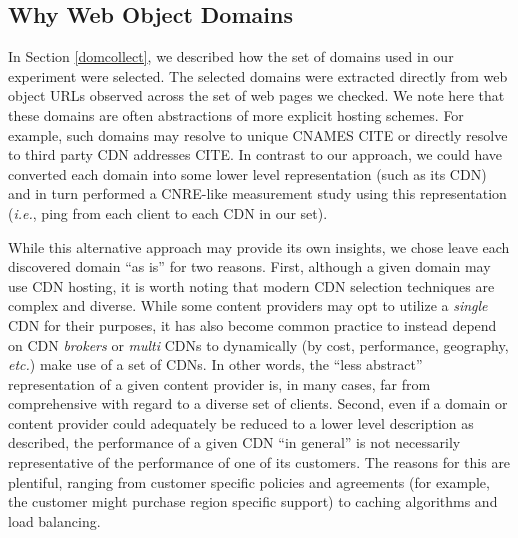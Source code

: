 \subsection{Why Web Object Domains}

In Section \ref{domcollect}, we described how the set of domains used in our
experiment were selected. The selected domains were extracted directly
from web object URLs observed across the set of web pages we checked. We note
here that these domains are often abstractions of more explicit hosting schemes.
For example, such domains may resolve to unique CNAMES CITE or directly resolve
to third party CDN addresses CITE. In contrast to our approach, we could have
converted each domain into some lower level representation (such as its CDN) and
in turn performed a CNRE-like measurement study using this representation
(\emph{i.e.}, ping from each client to each CDN in our set).

While this alternative approach may provide its own insights, we chose leave
each discovered domain ``as is'' for two reasons. First, although a given domain
may use CDN hosting, it is worth noting that modern CDN selection techniques are
complex and diverse. While some content providers may opt to utilize a
\emph{single} CDN for their purposes, it has also become common practice to
instead depend on CDN \emph{brokers} or \emph{multi} CDNs to dynamically (by
cost, performance, geography, \emph{etc.}) make use of a set of CDNs. In other
words, the ``less abstract'' representation of a given content provider is, in
many cases, far from comprehensive with regard to a diverse set of clients. Second, even if a domain or content provider could adequately be reduced to a
lower level description as described, the performance of a given CDN ``in
general'' is not necessarily representative of the performance of one of its
customers. The reasons for this are plentiful, ranging from customer specific
policies and agreements (for example, the customer might purchase region specific
support) to caching algorithms and load balancing. 
